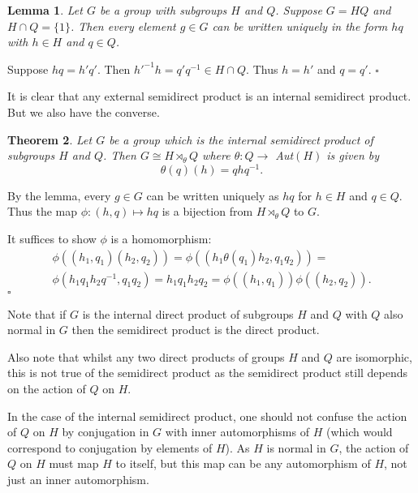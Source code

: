 \documentclass[10pt]{article}
\newtheorem{theorem}{Theorem}[section]
\newtheorem{lemma}[theorem]{Lemma}
\newenvironment{proof}[1][Proof]{\begin{trivlist}
\item[\hskip \labelsep {\itshape #1}]}{\end{trivlist}}
\begin{document}
\begin{lemma}
Let $G$ be a group with subgroups $H$ and $Q$. Suppose $G = HQ$ and $H\cap Q = \{1\}$. Then every element $g \in G$ can be written uniquely in the form $hq$ with $h \in H$ and $q \in Q$.
\end{lemma}

\begin{proof}
Suppose $hq = h'q'$. Then $h'^{-1}h = q'q^{-1} \in H\cap Q$. Thus $h = h'$ and $q = q'$. $\square$
\end{proof}

It is clear that any external semidirect product is an internal semidirect product. But we also have the converse.

\begin{theorem}
Let $G$ be a group which is the internal semidirect product of subgroups $H$ and $Q$. Then $G \cong H\rtimes_{\theta} Q$ where $\theta : Q \to$ Aut$(H)$ is given by
$$\theta(q)(h) = qhq^{-1}.$$
\end{theorem}

\begin{proof}
By the lemma, every $g \in G$ can be written uniquely as $hq$ for $h \in H$ and $q \in Q$. Thus the map $\phi : (h, q) \mapsto hq$ is a bijection from $H\rtimes_{\theta} Q$ to $G$.

It suffices to show $\phi$ is a homomorphism:
\begin{multline*}
\phi((h_1, q_1)(h_2, q_2)) = \phi((h_1\theta(q_1)h_2, q_1q_2)) =\\
\phi(h_1q_1h_2q^{-1}, q_1q_2) = h_1q_1h_2q_2 = \phi((h_1, q_1))\phi((h_2, q_2)).
\end{multline*} $\square$
\end{proof}

Note that if $G$ is the internal direct product of subgroups $H$ and $Q$ with $Q$ also normal in $G$ then the semidirect product is the direct product.

Also note that whilst any two direct products of groups $H$ and $Q$ are isomorphic, this is not true of the semidirect product as the semidirect product still depends on the action of $Q$ on $H$.

In the case of the internal semidirect product, one should not confuse the action of $Q$ on $H$ by conjugation in $G$ with inner automorphisms of $H$ (which would correspond to conjugation by elements of $H$). As $H$ is normal in $G$, the action of $Q$ on $H$ must map $H$ to itself, but this map can be any automorphism of $H$, not just an inner automorphism.
\end{document}
